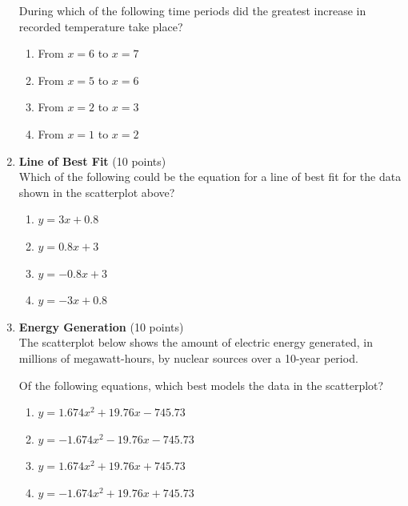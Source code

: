 \begin{enumerate}

  During which of the following time periods did the greatest increase in recorded temperature take place?
  \begin{enumerate}[label=(\Alph*)]
    \item From $x=6$ to $x=7$
    \item From $x=5$ to $x=6$
    \item From $x=2$ to $x=3$
    \item From $x=1$ to $x=2$
  \end{enumerate}
  \begin{subanswer}
  \end{subanswer}


  \newpage

  \item \textbf{Line of Best Fit} (10 points)\\
  Which of the following could be the equation for a line of best fit for the data shown in the scatterplot above?
  \begin{enumerate}[label=(\Alph*)]
    \item $y=3x+0.8$
    \item $y=0.8x+3$
    \item $y=-0.8x+3$
    \item $y=-3x+0.8$
  \end{enumerate}
  \begin{subanswer}
  \end{subanswer}

  \newpage

  \item \textbf{Energy Generation} (10 points)\\
  The scatterplot below shows the amount of electric energy generated, in millions of megawatt-hours, by nuclear sources over a 10-year period.

  Of the following equations, which best models the data in the scatterplot?
  \begin{enumerate}[label=(\Alph*)]
    \item $y=1.674x^{2}+19.76x-745.73$
    \item $y=-1.674x^{2}-19.76x-745.73$
    \item $y=1.674x^{2}+19.76x+745.73$
    \item $y=-1.674x^{2}+19.76x+745.73$
  \end{enumerate}
  \begin{subanswer}
  \end{subanswer}


\end{enumerate}
